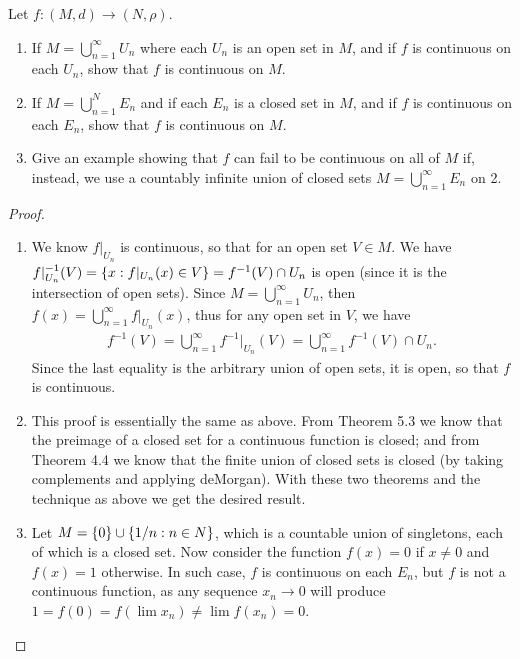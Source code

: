 \begin{exercise}{31}
Let $f: (M,d) \to (N,\rho)$.
\begin{enumerate}
    \item If $M =\bigcup^\infty_{n=1} U_n$ where each $U_n$ is an open set in $M$, and if $f$ is continuous on each $U_n$, show that $f$ is continuous on $M$.
    \item If $M =\bigcup^N_{n=1} E_n$ and if each $E_n$ is a closed set in $M$, and if $f$ is continuous on each $E_n$, show that $f$ is continuous on $M$.
    \item Give an example showing that $f$ can fail to be continuous on all of $M$ if, instead, we use a countably infinite union of closed sets $M = \bigcup^\infty_{n=1} E_n$ on 2.
\end{enumerate}
\end{exercise}
\begin{proof}
\begin{enumerate}
    \item We know $f|_{U_n}$ is continuous, so that for an open set $V\in M$.
    We have $f|_{U_n}^{-1}(V) = \{x: f|_{U_n}(x)\in V\} = f^{-1}(V)\cap U_n$ is open (since it is the intersection of open sets).
    Since $M=\bigcup_{n=1}^\infty U_n$, then $f(x)=\bigcup_{n=1}^\infty f|_{U_n}(x)$, thus for any open set in $V$, we have
    \begin{align*}
        f^{-1}(V) = \bigcup_{n=1}^\infty f^{-1}|_{U_n}(V) = \bigcup_{n=1}^\infty f^{-1}(V)\cap U_n.
    \end{align*}
    Since the last equality is the arbitrary union of open sets, it is open, so that $f$ is continuous.
    \item This proof is essentially the same as above.
    From Theorem 5.3 we know that the preimage of a closed set for a continuous function is closed;
    and from Theorem 4.4 we know that the finite union of closed sets is closed (by taking complements and applying deMorgan).
    With these two theorems and the technique as above we get the desired result.
    \item Let $M = \{0\} \cup \{1/n: n \in N\}$, which is a countable union of singletons, each of which is a closed set.
    Now consider the function $f(x)=0$ if $x\neq 0$ and $f(x)=1$ otherwise.
    In such case, $f$ is continuous on each $E_n$, but $f$ is not a continuous function, as any sequence $x_n\to 0$ will produce $1 =f(0) =f(\lim x_n) \neq \lim f(x_n) =0$.
\end{enumerate}
\end{proof} 

